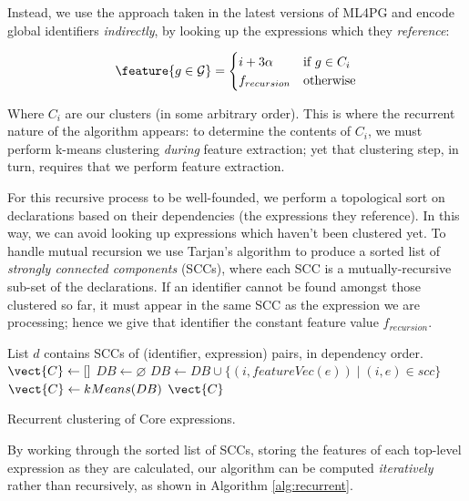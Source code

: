 Instead, we use the approach taken in the latest versions of ML4PG and encode
global identifiers \emph{indirectly}, by looking up the expressions which they
\emph{reference}:

\begin{equation} \label{eq:globalfeature}
  \feature{g \in \mathcal{G}} =
    \begin{cases}
      i + 3 \alpha \quad & \text{if $g \in C_i$} \\
      f_{recursion}         & \text{otherwise}
    \end{cases}
\end{equation}

Where $C_i$ are our clusters (in some arbitrary order). This is where the
recurrent nature of the algorithm appears: to determine the contents of $C_i$,
we must perform k-means clustering \emph{during} feature extraction; yet that
clustering step, in turn, requires that we perform feature extraction.

For this recursive process to be well-founded, we perform a topological sort on
declarations based on their dependencies (the expressions they reference). In
this way, we can avoid looking up expressions which haven't been clustered
yet. To handle mutual recursion we use Tarjan's algorithm \cite{tarjan1972depth}
to produce a sorted list of \emph{strongly connected components} (SCCs), where
each SCC is a mutually-recursive sub-set of the declarations. If an identifier
cannot be found amongst those clustered so far, it must appear in the same SCC
as the expression we are processing; hence we give that identifier the constant
feature value $f_{recursion}$.

\begin{algorithm}
  \begin{algorithmic}[1]
    \Require List $d$ contains SCCs of (identifier, expression) pairs, in
    dependency order.
      \State $\vect{C} \gets []$
      \State $DB \gets \varnothing$
        \State $DB \gets DB \cup \{(i, featureVec(e)) \mid (i, e) \in scc\}$
        \State $\vect{C} \gets kMeans(DB)$
      \EndFor
      \Return $\vect{C}$
    \EndProcedure
  \end{algorithmic}
  \caption{Recurrent clustering of Core expressions.}
  \label{alg:recurrent}
\end{algorithm}

By working through the sorted list of SCCs, storing the features of each
top-level expression as they are calculated, our algorithm can be computed
\emph{iteratively} rather than recursively, as shown in Algorithm
\ref{alg:recurrent}.

